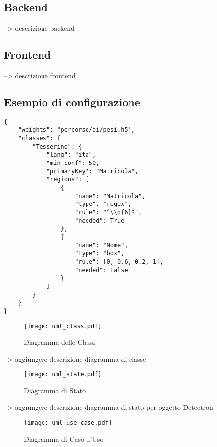 \documentclass[12pt,a4paper]{article}
\begin{document}
\subsection{Backend}

--> descrizione backend

\subsection{Frontend}

--> descrizione frontend

\pagebreak

\subsection{Esempio di configurazione}
\begin{verbatim}
{
    "weights": "percorso/ai/pesi.h5",
    "classes": {
        "Tesserino": {
            "lang": "ita",
            "min_conf": 50,
            "primaryKey": "Matricola",
            "regions": [
                {
                    "name": "Matricola",
                    "type": "regex",
                    "rule": "^\\d{6}$",
                    "needed": True
                },
                {
                    "name": "Nome",
                    "type": "box",
                    "rule": [0, 0.6, 0.2, 1],
                    "needed": False
                }
            ]
        }
    }
}
\end{verbatim}

\begin{figure}[p]
  \caption{Diagramma delle Classi}
  \centering
  \texttt{[image: uml\_class.pdf]}
\end{figure}

--> aggiungere descrizione diagramma di classe

\begin{figure}[p]
  \caption{Diagramma di Stato}
  \centering
  \texttt{[image: uml\_state.pdf]}
\end{figure}

--> aggiungere descrizione diagramma di stato per oggetto Detectron

\begin{figure}[p]
  \caption{Diagramma di Caso d'Uso}
  \centering
  \texttt{[image: uml\_use\_case.pdf]}
\end{figure}
\end{document}
